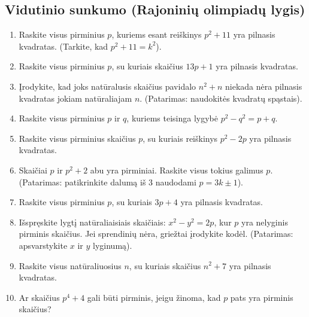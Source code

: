 \documentclass[11pt,a4paper]{scrartcl}
\begin{document}
\subsection*{Vidutinio sunkumo (Rajoninių olimpiadų lygis)}
\setcounter{enumi}{10}
\begin{enumerate}
    \item Raskite visus pirminius $p$, kuriems esant reiškinys $p^2 + 11$ yra pilnasis kvadratas. (Tarkite, kad $p^2 + 11 = k^2$).
    \item Raskite visus pirminius $p$, su kuriais skaičius $13p + 1$ yra pilnasis kvadratas.
    \item Įrodykite, kad joks natūralusis skaičius pavidalo $n^2 + n$ niekada nėra pilnasis kvadratas jokiam natūraliajam $n$. (Patarimas: naudokitės kvadratų spąstais).
    \item Raskite visus pirminius $p$ ir $q$, kuriems teisinga lygybė $p^2 - q^2 = p+q$.
    \item Raskite visus pirminius skaičius $p$, su kuriais reiškinys $p^2 - 2p$ yra pilnasis kvadratas.
    \item Skaičiai $p$ ir $p^2 + 2$ abu yra pirminiai. Raskite visus tokius galimus $p$. (Patarimas: patikrinkite dalumą iš 3 naudodami $p=3k \pm 1$).
    \item Raskite visus pirminius $p$, su kuriais $3p + 4$ yra pilnasis kvadratas.
    \item Išspręskite lygtį natūraliaisiais skaičiais: $x^2 - y^2 = 2p$, kur $p$ yra nelyginis pirminis skaičius. Jei sprendinių nėra, griežtai įrodykite kodėl. (Patarimas: apsvarstykite $x$ ir $y$ lyginumą).
    \item Raskite visus natūraliuosius $n$, su kuriais skaičius $n^2 + 7$ yra pilnasis kvadratas.
    \item Ar skaičius $p^4 + 4$ gali būti pirminis, jeigu žinoma, kad $p$ pats yra pirminis skaičius?
\end{enumerate}
\end{document}
